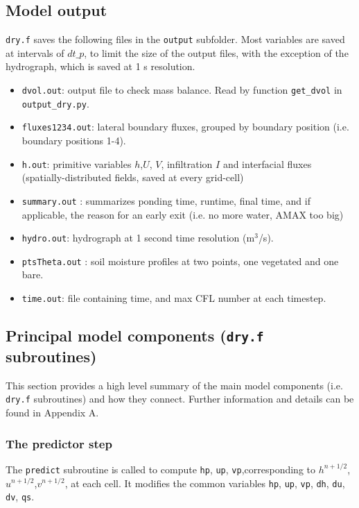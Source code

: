 \documentclass{article}
\newcommand{\code}[1]{\texttt{#1}}
\begin{document}
\subsection{Model output}

 \code{dry.f} saves the following  files in the \code{output} subfolder.
Most variables are saved at intervals of  $dt\_p$, to limit the size of the output files, with the exception of the hydrograph, which is saved at 1 s resolution.   
\begin{itemize}
	\item \code{dvol.out}:  output file to check mass balance. Read by function \code{get\_dvol} in \code{output\_dry.py}.
	\item \code{fluxes1234.out}: lateral boundary fluxes, grouped by boundary  position (i.e. boundary positions 1-4).  
	\item \code{h.out}: primitive variables $h$,$U$, $V$, infiltration $I$ and interfacial fluxes (spatially-distributed fields, saved at every grid-cell)
	\item \code{summary.out} : summarizes ponding time, runtime, final time, and if applicable, the reason for an early exit (i.e. no more water, AMAX too big) 
	\item \code{hydro.out}: hydrograph at 1 second time resolution (m$^3$/s).  
	\item \code{ptsTheta.out} : soil moisture profiles at two points, one vegetated and one bare. 
	\item \code{time.out}: file containing time, and max CFL number at each timestep.
\end{itemize}

\subsection{Principal model components (\code{dry.f} subroutines)}

This section provides a high level summary of the main model components (i.e. \code{dry.f} subroutines) and how they connect.  Further information and details can be found in Appendix A.

\subsubsection*{The predictor step}

The \code{predict} subroutine is called to compute \code{hp}, \code{up},  \code{vp},corresponding to $h^{n+1/2}$,$u^{n+1/2}$,$v^{n+1/2}$, at each cell.   It modifies the common variables  \code{hp}, \code{up},  \code{vp}, \code{dh}, \code{du}, \code{dv}, \code{qs}.
\end{document}
